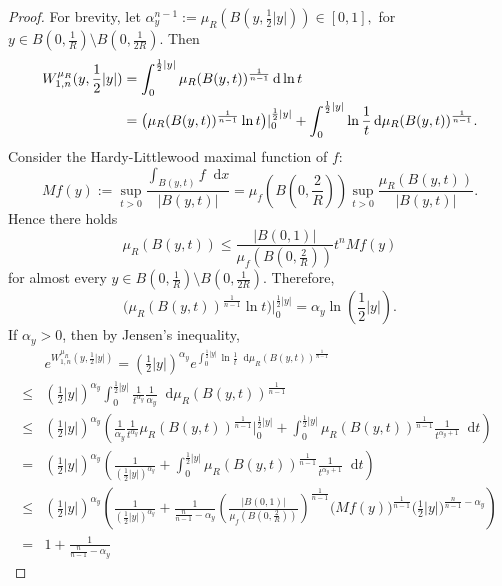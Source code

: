 \documentclass[10pt,a4paper]{amsart}
\numberwithin{equation}{section}
\newcommand{\dd}{\mathop{}\!\mathrm{d}}%
\newcommand{\dx}{\mathop{}\!\mathrm{d}x}
\begin{document}
\begin{proof}
    For brevity, let $\alpha_y^{n-1}:=\mu_R(B(y,\frac{1}{2}|y|))\in [0,1],$ for $y\in B(0,\frac{1}{R})\setminus B(0,\frac{1}{2R})$.  Then 
    \begin{align*}
        W_{1,n}^{\mu_R}(y,\frac{1}{2}|y|)
        &=\int_0^{\frac{1}{2}|y|}\mu_R(B(y,t))^{\frac{1}{n-1}}\dd \ln t \\ \notag
       & =\big(\mu_R(B(y,t))^{\frac{1}{n-1}}\ln t\big)|_0^{\frac{1}{2}|y|}
        +\int_0^{\frac{1}{2}|y|}\ln \frac{1}{t}\dd \mu_R(B(y,t))^{\frac{1}{n-1}}.
    \end{align*}
    Consider the Hardy-Littlewood maximal function of $f$:
    \[
        Mf(y):=
        \sup_{t>0}\frac{\int_{B(y,t)}f\dx}{|B(y,t)|}
        =\mu_f(B(0,\frac{2}{R}))\sup_{t>0}\frac{\mu_R(B(y,t))}{|B(y,t)|}.
    \]
    Hence there holds
    \[
        \mu_R(B(y,t))\leq \frac{|B(0,1)|}{\mu_f(B(0,\frac{2}{R}))}t^n Mf(y)
    \]
    for almost every $y \in B(0,\frac{1}{R})\setminus B(0,\frac{1}{2R})$. Therefore,
    \[
        \big(\mu_R(B(y,t))^{\frac{1}{n-1}}\ln t\big)|_0^{\frac{1}{2}|y|}
        =\alpha_y\ln(\frac{1}{2}|y|).
    \]
    If $\alpha_y>0$, then by Jensen's inequality,
    \begin{align*}
        & e^{W_{1,n}^{\mu_R}(y,\frac{1}{2}|y|)}
        =(\frac{1}{2}|y|)^{\alpha_y} 
        e^{\int_0^{\frac{1}{2}|y|} \ln \frac{1}{t}\dd \mu_R(B(y,t))^{\frac{1}{n-1}}
        }\\
        \leq &(\frac{1}{2}|y|)^{\alpha_y} \int_0^{\frac{1}{2}|y|}\frac{1}{t^{\alpha_y}}\frac{1}{\alpha_y}\dd \mu_R(B(y,t))^{\frac{1}{n-1}}\\
        \leq &(\frac{1}{2}|y|)^{\alpha_y}
        \left(
        \frac{1}{\alpha_y}\frac{1}{t^{\alpha_y}}\mu_R(B(y,t))^{\frac{1}{n-1}}\Big|_0^{\frac{1}{2}|y|}
        +\int_0^{\frac{1}{2}|y|}\mu_R(B(y,t))^{\frac{1}{n-1}}\frac{1}{t^{\alpha_y+1}}\dd t
        \right)\\
        =&(\frac{1}{2}|y|)^{\alpha_y}
        \left(
        \frac{1}{(\frac{1}{2}|y|)^{\alpha_y}}
        +\int_0^{\frac{1}{2}|y|}\mu_R(B(y,t))^{\frac{1}{n-1}}\frac{1}{t^{\alpha_y+1}}\dd t
        \right)\\
        \leq &(\frac{1}{2}|y|)^{\alpha_y}
        \left(
        \frac{1}{(\frac{1}{2}|y|)^{\alpha_y}}
        +\frac{1}{\frac{n}{n-1}-\alpha_y}
        \left(\frac{|B(0,1)|}{\mu_f(B(0,\frac{2}{R}))}\right)^{\frac{1}{n-1}}
        \Big(Mf(y)\Big)^{\frac{1}{n-1}}
        \Big(\frac{1}{2}|y|\Big)^{\frac{n}{n-1}-\alpha_y}
        \right)\\
        =&1
        +\frac{1}{\frac{n}{n-1}-\alpha_y}

\end{align*}
\end{proof}
\end{document}
